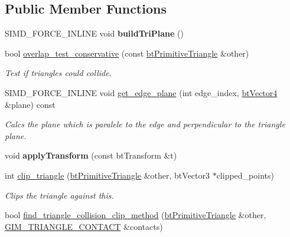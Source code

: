 \subsection*{Public Member Functions}
\begin{DoxyCompactItemize}
\item 
\mbox{\label{classbtPrimitiveTriangle_af744acb5a8197dd9154b9707fef252cc}} 
S\+I\+M\+D\+\_\+\+F\+O\+R\+C\+E\+\_\+\+I\+N\+L\+I\+NE void {\bfseries build\+Tri\+Plane} ()
\item 
bool \hyperlink{classbtPrimitiveTriangle_a844b5c15a34e656e64135f43a8d27d53}{overlap\+\_\+test\+\_\+conservative} (const \hyperlink{classbtPrimitiveTriangle}{bt\+Primitive\+Triangle} \&other)
\begin{DoxyCompactList}\small\item\em Test if triangles could collide. \end{DoxyCompactList}\item 
S\+I\+M\+D\+\_\+\+F\+O\+R\+C\+E\+\_\+\+I\+N\+L\+I\+NE void \hyperlink{classbtPrimitiveTriangle_a44c4e264a4aa6b92a1188743555f1c92}{get\+\_\+edge\+\_\+plane} (int edge\+\_\+index, \hyperlink{classbtVector4}{bt\+Vector4} \&plane) const
\begin{DoxyCompactList}\small\item\em Calcs the plane which is paralele to the edge and perpendicular to the triangle plane. \end{DoxyCompactList}\item 
\mbox{\label{classbtPrimitiveTriangle_ab896f319c6d779b5028090df42432cf9}} 
void {\bfseries apply\+Transform} (const bt\+Transform \&t)
\item 
int \hyperlink{classbtPrimitiveTriangle_a56e930410f18f866e47431ed77c6c3ca}{clip\+\_\+triangle} (\hyperlink{classbtPrimitiveTriangle}{bt\+Primitive\+Triangle} \&other, bt\+Vector3 $\ast$clipped\+\_\+points)
\begin{DoxyCompactList}\small\item\em Clips the triangle against this. \end{DoxyCompactList}\item 
bool \hyperlink{classbtPrimitiveTriangle_a24c4903aecd95c2d11bbc42ba3df0e66}{find\+\_\+triangle\+\_\+collision\+\_\+clip\+\_\+method} (\hyperlink{classbtPrimitiveTriangle}{bt\+Primitive\+Triangle} \&other, \hyperlink{structGIM__TRIANGLE__CONTACT}{G\+I\+M\+\_\+\+T\+R\+I\+A\+N\+G\+L\+E\+\_\+\+C\+O\+N\+T\+A\+CT} \&contacts)

\end{DoxyCompactItemize}
